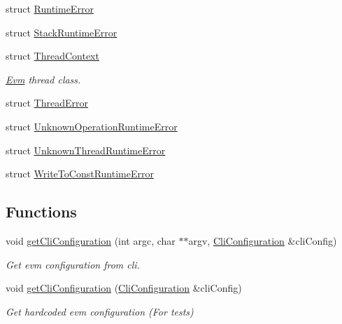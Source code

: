 \begin{DoxyCompactItemize}
\item 
struct \mbox{\hyperlink{struct_evm_1_1_runtime_error}{Runtime\+Error}}
\item 
struct \mbox{\hyperlink{struct_evm_1_1_stack_runtime_error}{Stack\+Runtime\+Error}}
\item 
struct \mbox{\hyperlink{struct_evm_1_1_thread_context}{Thread\+Context}}
\begin{DoxyCompactList}\small\item\em \mbox{\hyperlink{namespace_evm}{Evm}} thread class. \end{DoxyCompactList}\item 
struct \mbox{\hyperlink{struct_evm_1_1_thread_error}{Thread\+Error}}
\item 
struct \mbox{\hyperlink{struct_evm_1_1_unknown_operation_runtime_error}{Unknown\+Operation\+Runtime\+Error}}
\item 
struct \mbox{\hyperlink{struct_evm_1_1_unknown_thread_runtime_error}{Unknown\+Thread\+Runtime\+Error}}
\item 
struct \mbox{\hyperlink{struct_evm_1_1_write_to_const_runtime_error}{Write\+To\+Const\+Runtime\+Error}}
\end{DoxyCompactItemize}
\subsection*{Functions}
\begin{DoxyCompactItemize}
\item 
void \mbox{\hyperlink{namespace_evm_aa2edd047bba5bfc0fd7bdf9d49538c16}{get\+Cli\+Configuration}} (int argc, char $\ast$$\ast$argv, \mbox{\hyperlink{struct_evm_1_1_cli_configuration}{Cli\+Configuration}} \&cli\+Config)
\begin{DoxyCompactList}\small\item\em Get evm configuration from cli. \end{DoxyCompactList}\item 
\mbox{\label{namespace_evm_a2bc4977241c7e7f3b7014738bdb57424}} 
void \mbox{\hyperlink{namespace_evm_a2bc4977241c7e7f3b7014738bdb57424}{get\+Cli\+Configuration}} (\mbox{\hyperlink{struct_evm_1_1_cli_configuration}{Cli\+Configuration}} \&cli\+Config)
\begin{DoxyCompactList}\small\item\em Get hardcoded evm configuration (For tests) \end{DoxyCompactList}\end{DoxyCompactItemize}


